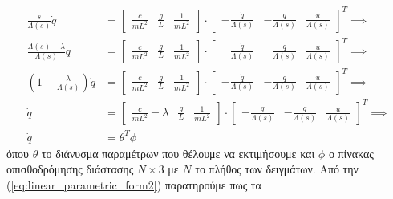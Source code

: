 \documentclass[a4paper,12pt]{article}
\begin{document}
\begin{equation}
\begin{aligned}
    \frac{s}{\Lambda(s)}\dot{q} &=
    \left[
    \begin{matrix}
        \frac{c}{mL^2} & \frac{g}{L} & \frac{1}{mL^2}
    \end{matrix}
    \right]
    \cdot
    \left[
    \begin{matrix}
        -\frac{\dot{q}}{\Lambda(s)} & -\frac{q}{\Lambda(s)} & \frac{u}{\Lambda(s)}
    \end{matrix}
    \right]^T 
    \implies \\
    \frac{\Lambda(s) - \lambda}{\Lambda(s)}\dot{q} &=
    \left[
    \begin{matrix}
        \frac{c}{mL^2} & \frac{g}{L} & \frac{1}{mL^2}
    \end{matrix}
    \right]
    \cdot
    \left[
    \begin{matrix}
        -\frac{\dot{q}}{\Lambda(s)} & -\frac{q}{\Lambda(s)} & \frac{u}{\Lambda(s)}
    \end{matrix}
    \right]^T
    \implies \\
    \left(1 - \frac{\lambda}{\Lambda(s)}\right)\dot{q} &=
    \left[
    \begin{matrix}
        \frac{c}{mL^2} & \frac{g}{L} & \frac{1}{mL^2}
    \end{matrix}
    \right]
    \cdot
    \left[
    \begin{matrix}
        -\frac{\dot{q}}{\Lambda(s)} & -\frac{q}{\Lambda(s)} & \frac{u}{\Lambda(s)}
    \end{matrix}
    \right]^T
    \implies \\
    \dot{q} &=
    \left[
    \begin{matrix}
        \frac{c}{mL^2}-\lambda & \frac{g}{L} & \frac{1}{mL^2}
    \end{matrix}
    \right]
    \cdot
    \left[
    \begin{matrix}
        -\frac{\dot{q}}{\Lambda(s)} & -\frac{q}{\Lambda(s)} & \frac{u}{\Lambda(s)}
    \end{matrix}
    \right]^T
    \implies \\
    \dot{q} &= \theta^T \phi
    \label{eq:linear_parametric_form2}   
\end{aligned}
\end{equation}
όπου $\theta$ το διάνυσμα παραμέτρων που θέλουμε να εκτιμήσουμε και $\phi$ ο πίνακας οπισθοδρόμησης διάστασης 
$N\times3$ με $N$ το πλήθος των δειγμάτων. Από την (\ref{eq:linear_parametric_form2}) παρατηρούμε πως τα 
\end{document}
